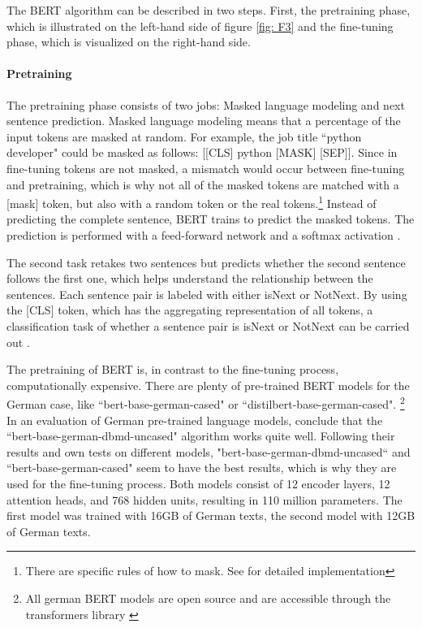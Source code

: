 \documentclass[12pt, a4paper, titlepage]{article}
\begin{document}
The \ac{BERT} algorithm can be described in two steps. First, the pretraining phase, which is illustrated on the left-hand side of figure \ref{fig: F3} and the fine-tuning phase, which is visualized on the right-hand side. 

\paragraph{Pretraining}
The pretraining phase consists of two jobs: Masked language modeling and next sentence prediction. Masked language modeling means that a percentage of the input tokens are masked at random. For example, the job title ``python developer" could be masked as follows: [[CLS] python [MASK] [SEP]]. Since in fine-tuning tokens are not masked, a mismatch would occur between fine-tuning and pretraining, which is why not all of the masked tokens are matched with a [mask] token, but also with a random token or the real tokens.\footnote{There are specific rules of how to mask. See \citet{devlin2018} for detailed implementation} Instead of predicting the complete sentence, \ac{BERT} trains to predict the masked tokens. The prediction is performed with a feed-forward network and a softmax activation \citep{devlin2018,ravichandiran2021}. 

The second task retakes two sentences but predicts whether the second sentence follows the first one, which helps understand the relationship between the sentences. Each sentence pair is labeled with either isNext or NotNext. By using the [CLS] token, which has the aggregating representation of all tokens, a classification task of whether a sentence pair is isNext or NotNext can be carried out \citep{ravichandiran2021,devlin2018}.

The pretraining of \ac{BERT} is, in contrast to the fine-tuning process, computationally expensive. There are plenty of pre-trained \ac{BERT} models for the German case, like ``bert-base-german-cased" or ``distilbert-base-german-cased". \footnote{All german \ac{BERT} models are open source and are accessible through the transformers library \citep{wolf2020}} In an evaluation of German pre-trained language models, \citet{assenmacher2021} conclude that the ``bert-base-german-dbmd-uncased" algorithm works quite well. Following their results and own tests on different models, "bert-base-german-dbmd-uncased`` and ``bert-base-german-cased" seem to have the best results, which is why they are used for the fine-tuning process. Both models consist of 12 encoder layers, 12 attention heads, and 768 hidden units, resulting in 110 million parameters. The first model was trained with 16GB of German texts, the second model with 12GB of German texts. 
\end{document}
